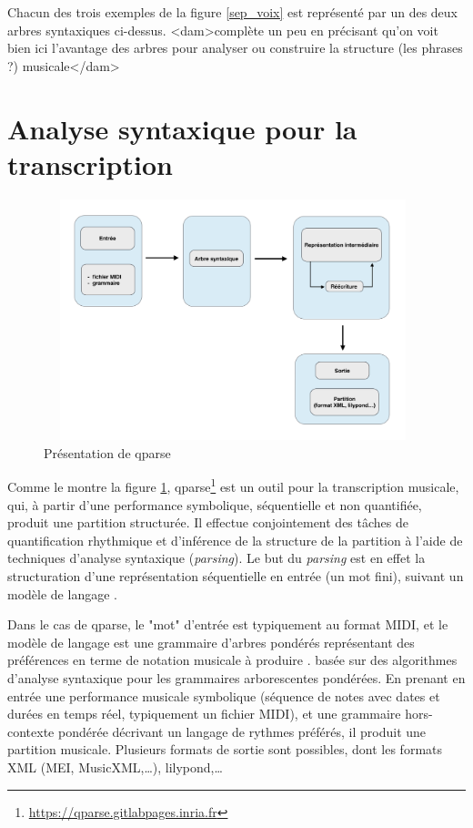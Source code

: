 Chacun des trois exemples de la figure \ref{sep_voix} est représenté par un des
deux arbres syntaxiques ci-dessus.
<dam>complète un peu en précisant qu'on voit bien ici l'avantage des arbres
pour analyser ou construire la structure (les phrases ?) musicale</dam>

\section{Analyse syntaxique pour la transcription}

\begin{figure}[h]
\centering
\includegraphics[height=70mm, width=110mm]{
z_images/3_methodes/1_Analyse_syntaxique/schema_qparse.png}
\caption{Présentation de qparse}
\label{presentation_qparse}
\end{figure}

Comme le montre la figure \ref{presentation_qparse}, qparse\footnote{
\url{https://qparse.gitlabpages.inria.fr}} est un outil pour la transcription
musicale, qui, à partir d'une performance symbolique, séquentielle et non
quantifiée, produit une partition structurée. Il effectue conjointement des
tâches de quantification rhythmique et d'inférence de la structure de la
partition à l'aide de techniques d’analyse syntaxique (\textit{parsing}). Le
but du \textit{parsing} est en effet la structuration d'une représentation
séquentielle en entrée (un mot fini), suivant un modèle de langage
\cite{grune2007parsing}.

Dans le cas de qparse, le "mot" d'entrée est typiquement au format MIDI, et le
modèle de langage est une grammaire d'arbres pondérés représentant des
préférences en terme de notation musicale à produire \cite{droste2009handbook}.
basée sur des algorithmes d'analyse syntaxique pour les grammaires
arborescentes pondérées. En prenant en entrée une performance musicale
symbolique (séquence de notes avec dates et durées en temps réel, typiquement
un fichier MIDI), et une grammaire hors-contexte pondérée décrivant un langage
de rythmes préférés, il produit une partition musicale. Plusieurs formats de
sortie sont possibles, dont les formats XML (MEI, MusicXML,…), lilypond,…

